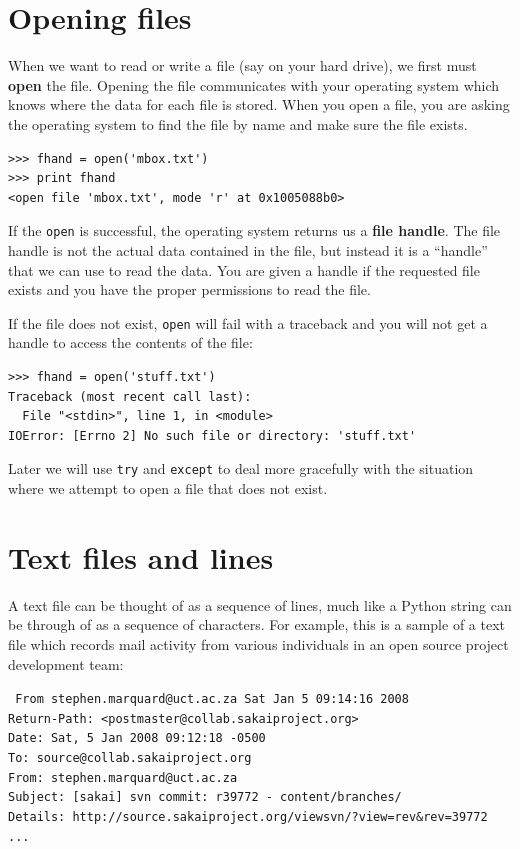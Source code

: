 \documentclass[10pt]{book}
\begin{document}
\section{Opening files}

When we want to read or write a file (say on your hard drive), we first
must {\bf open} the file.  Opening the file communicates with your operating
system which knows where the data for each file is stored.  When you open
a file, you are asking the operating system to find the file by name
and make sure the file exists.

\beforeverb
\begin{verbatim}
>>> fhand = open('mbox.txt')
>>> print fhand
<open file 'mbox.txt', mode 'r' at 0x1005088b0>
\end{verbatim}
\afterverb
%
If the {\tt open} is successful, the operating system returns us a 
{\bf file handle}.  The file handle is not the actual data contained
in the file, but instead it is a ``handle'' that we can use to 
read the data.   You are given a handle if the requested file
exists and you have the proper permissions to read the file.

If the file does not exist, {\tt open} will fail with a traceback and you 
will not get a handle to access the contents of the file:

\beforeverb
\begin{verbatim}
>>> fhand = open('stuff.txt')
Traceback (most recent call last):
  File "<stdin>", line 1, in <module>
IOError: [Errno 2] No such file or directory: 'stuff.txt'
\end{verbatim}
\afterverb
%
Later we will use {\tt try} and {\tt except} to deal more gracefully
with the situation where we attempt to open a file that does 
not exist.

\section{Text files and lines}

A text file can be thought of as a sequence of lines, much like a Python
string can be through of as a sequence of characters.  For example, this
is a sample of a text file which records mail activity from various
individuals in an open source project development team:

{\tt
From stephen.marquard@uct.ac.za Sat Jan  5 09:14:16 2008\\
Return-Path: <postmaster@collab.sakaiproject.org>\\
Date: Sat, 5 Jan 2008 09:12:18 -0500\\
To: source@collab.sakaiproject.org\\
From: stephen.marquard@uct.ac.za\\
Subject: [sakai] svn commit: r39772 - content/branches/\\
Details: http://source.sakaiproject.org/viewsvn/?view=rev\&rev=39772\\
...
}
\end{document}
